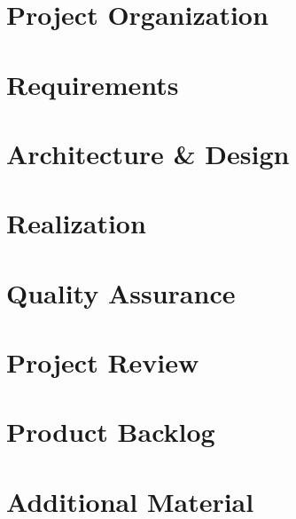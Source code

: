 \documentclass[a4paper,12pt,twoside,BCOR=15mm,parskip=half*]{scrartcl}
\begin{document}





\cleardoubleemptypage
\tableofcontents

\clearpage
\listoffigures
\listoftables

\clearpage
\section{Project Organization}


\clearpage
\section{Requirements}


\clearpage
\section{Architecture \& Design}\label{sec:design}


\clearpage
\section{Realization}


\clearpage

\clearpage

\clearpage

\clearpage


\clearpage
\section{Quality Assurance}


\clearpage
\section{Project Review}


\clearpage


\clearpage
\appendix
\section{Product Backlog}


\clearpage
\section{Additional Material}


\clearpage

\end{document}
